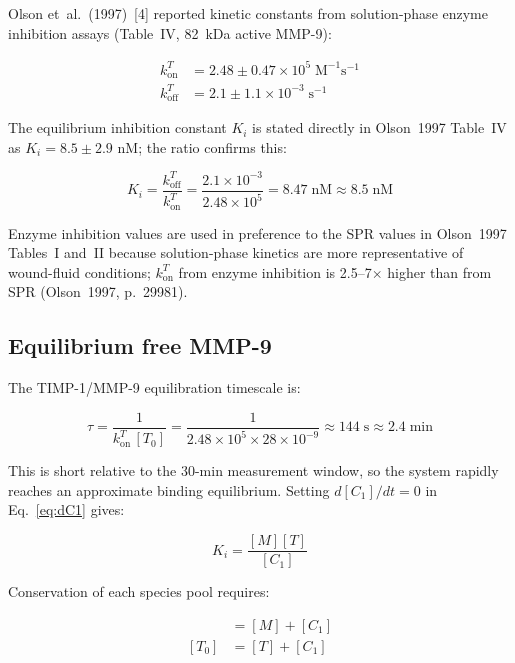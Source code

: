 \documentclass[10pt,a4paper]{article}
\numberwithin{equation}{section}
\newcommand{\kon}{k_{\text{on}}}
\newcommand{\koff}{k_{\text{off}}}
\newcommand{\Mms}{\text{M}^{-1}\text{s}^{-1}}
\newcommand{\cit}[1]{[#1]}   %
\begin{document}
Olson et~al.\ (1997)~\cit{4} reported kinetic constants from solution-phase enzyme
inhibition assays (Table~IV, 82~kDa active MMP-9):

\begin{align*}
\kon^T &= 2.48 \pm 0.47 \times 10^5\;\Mms \\
\koff^T &= 2.1 \pm 1.1 \times 10^{-3}\;\text{s}^{-1}
\end{align*}

The equilibrium inhibition constant $K_i$ is stated directly in Olson~1997 Table~IV
as $K_i = 8.5 \pm 2.9$ nM; the ratio confirms this:

\begin{equation}
K_i = \frac{\koff^T}{\kon^T}
= \frac{2.1 \times 10^{-3}}{2.48 \times 10^5}
= 8.47\;\text{nM} \approx 8.5\;\text{nM}
\label{eq:Ki}
\end{equation}

Enzyme inhibition values are used in preference to the SPR values in Olson~1997
Tables~I and~II because solution-phase kinetics are more representative of wound-fluid
conditions; $\kon^T$ from enzyme inhibition is 2.5--7$\times$ higher than from SPR
(Olson~1997, p.~29981).

\subsection{Equilibrium free MMP-9}

The TIMP-1/MMP-9 equilibration timescale is:

\begin{equation*}
\tau = \frac{1}{\kon^T\,[T_0]}
= \frac{1}{2.48 \times 10^5 \times 28 \times 10^{-9}}
\approx 144\;\text{s} \approx 2.4\;\text{min}
\end{equation*}

This is short relative to the 30-min measurement window, so the system rapidly
reaches an approximate binding equilibrium. Setting $d[C_1]/dt = 0$ in
Eq.~\eqref{eq:dC1} gives:

\begin{equation}
K_i = \frac{[M][T]}{[C_1]} \label{eq:Keq}
\end{equation}

Conservation of each species pool requires:

\begin{align}
[M_0] &= [M] + [C_1] \label{eq:Mcons} \\
[T_0] &= [T] + [C_1] \label{eq:Tcons}
\end{align}
\end{document}

